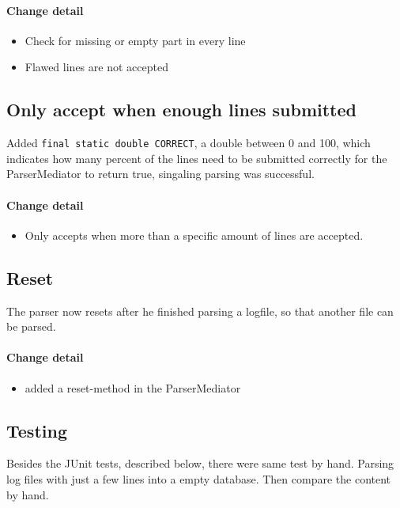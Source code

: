 \paragraph{Change detail}
\begin{itemize}
  \item Check for missing or empty part in every line
  \item Flawed lines are not accepted
\end{itemize}

\subsection{Only accept when enough lines submitted}
Added \texttt{final static double CORRECT}, a double between 0 and 100, which indicates how many percent of the lines need to be
submitted correctly for the ParserMediator to return true, singaling parsing was successful.

\paragraph{Change detail}
\begin{itemize}
  \item Only accepts when more than a specific amount of lines are accepted.
\end{itemize}

\subsection{Reset}
The parser now resets after he finished parsing a logfile, so that another file can be parsed.

\paragraph{Change detail}
\begin{itemize}
  \item added a reset-method in the ParserMediator
\end{itemize}


\subsection{Testing}

Besides the JUnit tests, described below, there were same test by hand. Parsing log files with
just a few lines into a empty database. Then compare the content by hand.

